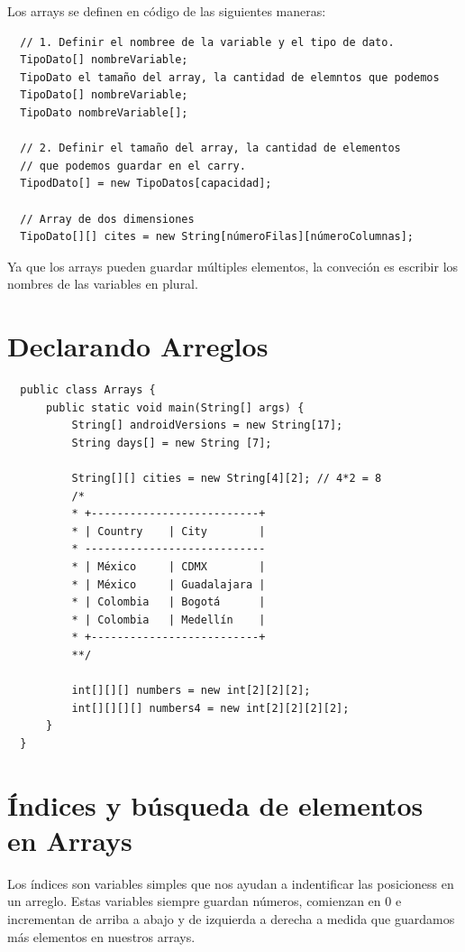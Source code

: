 \documentclass{article}
\begin{document}
Los arrays se definen en código de las siguientes maneras:

\begin{verbatim}
  // 1. Definir el nombree de la variable y el tipo de dato.
  TipoDato[] nombreVariable;
  TipoDato el tamaño del array, la cantidad de elemntos que podemos
  TipoDato[] nombreVariable;
  TipoDato nombreVariable[];

  // 2. Definir el tamaño del array, la cantidad de elementos
  // que podemos guardar en el carry.
  TipodDato[] = new TipoDatos[capacidad];

  // Array de dos dimensiones
  TipoDato[][] cites = new String[númeroFilas][númeroColumnas];
\end{verbatim}

Ya que los arrays pueden guardar múltiples elementos, la conveción es escribir
los nombres de las variables en plural.

\section{Declarando Arreglos}%

\begin{verbatim}
  public class Arrays {
      public static void main(String[] args) {
          String[] androidVersions = new String[17];
          String days[] = new String [7];

          String[][] cities = new String[4][2]; // 4*2 = 8
          /*
          * +--------------------------+
          * | Country    | City        |
          * ----------------------------
          * | México     | CDMX        |
          * | México     | Guadalajara |
          * | Colombia   | Bogotá      |
          * | Colombia   | Medellín    |
          * +--------------------------+
          **/

          int[][][] numbers = new int[2][2][2];
          int[][][][] numbers4 = new int[2][2][2][2];
      }
  }
\end{verbatim}


\section{Índices y búsqueda de elementos en Arrays}%
Los índices son variables simples que nos ayudan a indentificar las posicioness
en un arreglo. Estas variables siempre guardan números, comienzan en 0 e
incrementan de arriba a abajo y de izquierda a derecha a medida que guardamos
más elementos en nuestros arrays.\\
\end{document}
